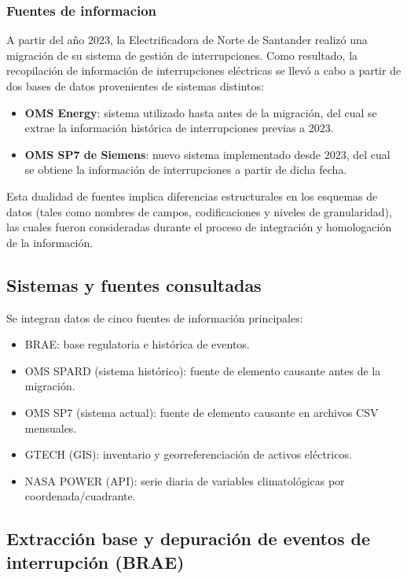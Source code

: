 \subsubsection{Fuentes de informacion}

A partir del año $2023$, la Electrificadora de Norte de Santander realizó una migración de su sistema de gestión de interrupciones. Como resultado, la recopilación de información de interrupciones eléctricas se llevó a cabo a partir de dos bases de datos provenientes de sistemas distintos:

\begin{itemize}
\item \textbf{OMS Energy}: sistema utilizado hasta antes de la migración, del cual se extrae la información histórica de interrupciones previas a $2023$.
\item \textbf{OMS SP7 de Siemens}: nuevo sistema implementado desde $2023$, del cual se obtiene la información de interrupciones a partir de dicha fecha.
\end{itemize}

Esta dualidad de fuentes implica diferencias estructurales en los esquemas de datos (tales como nombres de campos, codificaciones y niveles de granularidad), las cuales fueron consideradas durante el proceso de integración y homologación de la información.


\subsection{Sistemas y fuentes consultadas}

Se integran datos de cinco fuentes de información principales:

\begin{itemize}
\item BRAE: base regulatoria e histórica de eventos.
\item OMS SPARD (sistema histórico): fuente de elemento causante antes de la migración.
\item OMS SP7 (sistema actual): fuente de elemento causante en archivos CSV mensuales.
\item GTECH (GIS): inventario y georreferenciación de activos eléctricos.
\item NASA POWER (API): serie diaria de variables climatológicas por coordenada/cuadrante.
\end{itemize}

\subsection{Extracción base y depuración de eventos de interrupción (BRAE)}

